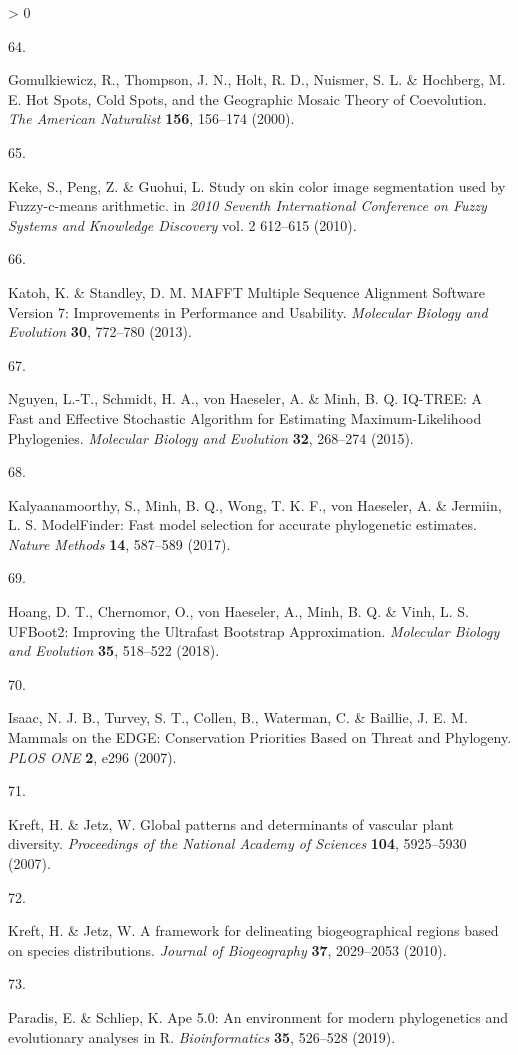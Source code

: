 \documentclass[11pt]{article}
\newlength{\cslhangindent}
\newlength{\csllabelwidth}
\newenvironment{CSLReferences}[3] %
 {%
  \setlength{\parindent}{0pt}
  \ifodd #1 \everypar{\setlength{\hangindent}{\cslhangindent}}\ignorespaces\fi
  \ifnum #2 > 0
  \setlength{\parskip}{#2\baselineskip}
  \fi
 }%
 {}
\newcommand{\CSLLeftMargin}[1]{\parbox[t]{\maxof{\widthof{#1}}{\csllabelwidth}}{#1}}
\newcommand{\CSLRightInline}[1]{\parbox[t]{\linewidth}{#1}}
\begin{document}
\begin{CSLReferences}{0}{0}
\leavevmode\hypertarget{ref-Gomulkiewicz2000HotSpo}{}%
\CSLLeftMargin{64. }
\CSLRightInline{Gomulkiewicz, R., Thompson, J. N., Holt, R. D., Nuismer,
S. L. \& Hochberg, M. E. Hot Spots, Cold Spots, and the Geographic
Mosaic Theory of Coevolution. \emph{The American Naturalist}
\textbf{156}, 156--174 (2000).}

\leavevmode\hypertarget{ref-Keke2010StuSki}{}%
\CSLLeftMargin{65. }
\CSLRightInline{Keke, S., Peng, Z. \& Guohui, L. Study on skin color
image segmentation used by Fuzzy-c-means arithmetic. in \emph{2010
Seventh International Conference on Fuzzy Systems and Knowledge
Discovery} vol. 2 612--615 (2010).}

\leavevmode\hypertarget{ref-Katoh2013MafMul}{}%
\CSLLeftMargin{66. }
\CSLRightInline{Katoh, K. \& Standley, D. M. MAFFT Multiple Sequence
Alignment Software Version 7: Improvements in Performance and Usability.
\emph{Molecular Biology and Evolution} \textbf{30}, 772--780 (2013).}

\leavevmode\hypertarget{ref-Nguyen2015IqtFas}{}%
\CSLLeftMargin{67. }
\CSLRightInline{Nguyen, L.-T., Schmidt, H. A., von Haeseler, A. \& Minh,
B. Q. IQ-TREE: A Fast and Effective Stochastic Algorithm for Estimating
Maximum-Likelihood Phylogenies. \emph{Molecular Biology and Evolution}
\textbf{32}, 268--274 (2015).}

\leavevmode\hypertarget{ref-Kalyaanamoorthy2017ModFas}{}%
\CSLLeftMargin{68. }
\CSLRightInline{Kalyaanamoorthy, S., Minh, B. Q., Wong, T. K. F., von
Haeseler, A. \& Jermiin, L. S. ModelFinder: Fast model selection for
accurate phylogenetic estimates. \emph{Nature Methods} \textbf{14},
587--589 (2017).}

\leavevmode\hypertarget{ref-Hoang2018UfbImp}{}%
\CSLLeftMargin{69. }
\CSLRightInline{Hoang, D. T., Chernomor, O., von Haeseler, A., Minh, B.
Q. \& Vinh, L. S. UFBoot2: Improving the Ultrafast Bootstrap
Approximation. \emph{Molecular Biology and Evolution} \textbf{35},
518--522 (2018).}

\leavevmode\hypertarget{ref-Isaac2007MamEdg}{}%
\CSLLeftMargin{70. }
\CSLRightInline{Isaac, N. J. B., Turvey, S. T., Collen, B., Waterman, C.
\& Baillie, J. E. M. Mammals on the EDGE: Conservation Priorities Based
on Threat and Phylogeny. \emph{PLOS ONE} \textbf{2}, e296 (2007).}

\leavevmode\hypertarget{ref-Kreft2007GloPat}{}%
\CSLLeftMargin{71. }
\CSLRightInline{Kreft, H. \& Jetz, W. Global patterns and determinants
of vascular plant diversity. \emph{Proceedings of the National Academy
of Sciences} \textbf{104}, 5925--5930 (2007).}

\leavevmode\hypertarget{ref-Kreft2010FraDel}{}%
\CSLLeftMargin{72. }
\CSLRightInline{Kreft, H. \& Jetz, W. A framework for delineating
biogeographical regions based on species distributions. \emph{Journal of
Biogeography} \textbf{37}, 2029--2053 (2010).}

\leavevmode\hypertarget{ref-Paradis2019ApeEnv}{}%
\CSLLeftMargin{73. }
\CSLRightInline{Paradis, E. \& Schliep, K. Ape 5.0: An environment for
modern phylogenetics and evolutionary analyses in R.
\emph{Bioinformatics} \textbf{35}, 526--528 (2019).}

\end{CSLReferences}
\end{document}
